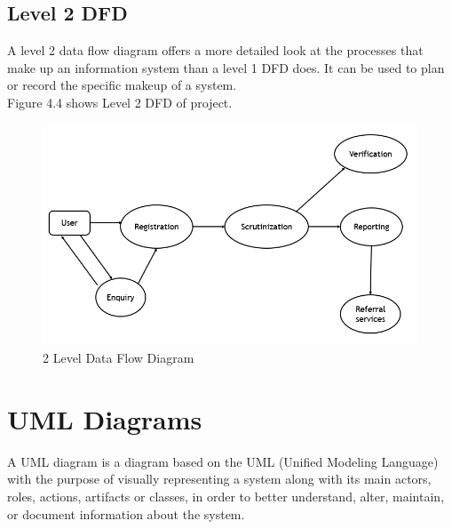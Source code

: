 \subsection{Level 2 DFD}

A level 2 data flow diagram offers a more detailed look at the processes that make up an information system than a level 1 DFD does. It can be used to plan or record the specific makeup of a system.\\ Figure 4.4 shows Level 2 DFD of project.
\begin{figure}[H]
    \centering
    \includegraphics[width=12cm]{design/2 Level DFD.png}
    \caption{2 Level Data Flow Diagram}
    \label{fig:my_label}
\end{figure}

\newpage
\section{UML Diagrams}
A UML diagram is a diagram based on the UML (Unified Modeling Language) with the purpose of visually representing a system along with its main actors, roles, actions, artifacts or classes, in order to better understand, alter, maintain, or document information about the system.

